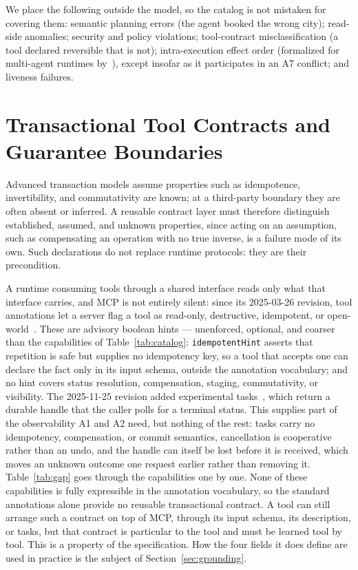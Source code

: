 \documentclass{article}
\begin{document}
We place the following outside the model, so the catalog is not mistaken for covering them: semantic planning errors (the agent booked the wrong city); read-side
anomalies; security and policy
violations; tool-contract misclassification (a tool declared reversible that
is not); intra-execution effect order (formalized for multi-agent runtimes
by~\cite{khan2026verified}), except insofar as it participates in an A7
conflict; and liveness failures.

\section{Transactional Tool Contracts and Guarantee Boundaries}
\label{sec:contracts}
\label{sec:unknown}

Advanced transaction models assume properties such as idempotence,
invertibility, and commutativity are known; at a third-party boundary they
are often absent or inferred. A reusable contract layer must
therefore distinguish established, assumed, and unknown properties, since
acting on an assumption, such as compensating an operation with no true inverse, is a failure mode of its own. Such declarations do not replace runtime
protocols: they are their precondition.

A runtime consuming tools through a shared interface reads only what that
interface carries, and MCP is not entirely silent: since its 2025-03-26
revision, tool annotations let a server flag a tool as read-only,
destructive, idempotent, or open-world~\cite{mcp2025spec}. These are advisory boolean hints ---
unenforced, optional, and coarser than the capabilities of
Table~\ref{tab:catalog}: \texttt{idempotentHint} asserts that repetition is
safe but supplies no idempotency key, so a tool that accepts one can declare
the fact only in its input schema, outside the annotation vocabulary; and no
hint covers status resolution, compensation, staging, commutativity, or
visibility. The 2025-11-25 revision added experimental
tasks~\cite{mcp2025tasks}, which return a durable handle that the caller
polls for a terminal status. This supplies part of the observability A1
and A2 need, but nothing of the rest: tasks carry no idempotency,
compensation, or commit semantics, cancellation is cooperative rather
than an undo, and the handle can itself be lost before it is received,
which moves an unknown outcome one request earlier rather than removing
it.
Table~\ref{tab:gap} goes through the capabilities one by one. None of these
capabilities is fully expressible in the annotation vocabulary, so the standard annotations alone
provide no reusable transactional contract. A tool can still arrange such
a contract on top of MCP, through its input schema, its description, or
tasks, but that contract is particular to the tool and must be learned tool
by tool. This is a property of the specification. How the four fields it
does define are used in practice is the subject of
Section~\ref{sec:grounding}.
\end{document}
